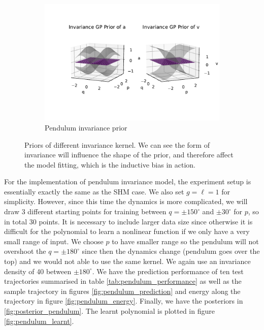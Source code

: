 \documentclass{statsmsc}
\begin{document}
\begin{figure}[H]
\begin{subfigure}[b]{0.6\linewidth}
         \includegraphics[width=\linewidth]{../codes/figures/prior_pendulum_invariance.pdf}
         \caption{Pendulum invariance prior}
         \label{fig:prior_pendulum_invariance}
     \end{subfigure}
        \caption{Priors of different invariance kernel. We can see the form of invariance will influence the shape of the prior, and therefore affect the model fitting, which is the inductive bias in action.}
        \label{fig:priors}
\end{figure}

For the implementation of pendulum invariance model, the experiment setup is essentially exactly the same as the SHM case. 
We also set $g=\ell=1$ for simplicity.
However, since this time the dynamics is more complicated, we will draw 3 different starting points for training between $q=\pm 150^{\circ}$ and $\pm 30^{\circ}$ for $p$, so in total 30 points.
It is necessary to include larger data size since otherwise it is difficult for the polynomial to learn a nonlinear function if we only have a very small range of input.
We choose $p$ to have smaller range so the pendulum will not overshoot the $q=\pm 180^\circ$ since then the dynamics change (pendulum goes over the top) and we would not able to use the same kernel.
We again use an invariance density of 40 between $\pm 180^{\circ}$.
We have the prediction performance of ten test trajectories summarised in table \ref{tab:pendulum_performance} as well as the sample trajectory in figures \ref{fig:pendulum_prediction} and energy along the trajectory in figure \ref{fig:pendulum_energy}.
Finally, we have the posteriors in \ref{fig:posterior_pendulum}.
The learnt polynomial is plotted in figure \ref{fig:pendulum_learnt}.
\end{document}
